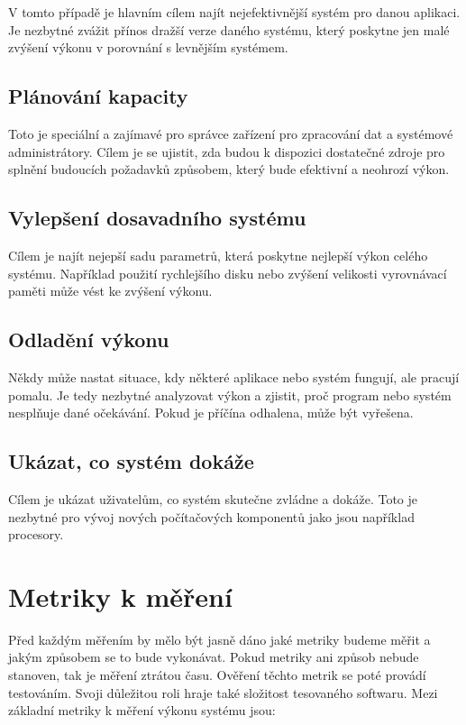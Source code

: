 V tomto případě je hlavním cílem najít nejefektivnější systém pro danou aplikaci. Je nezbytné zvážit přínos dražší verze daného systému, který poskytne jen malé zvýšení výkonu v porovnání s levnějším systémem.

\subsection*{Plánování kapacity}

Toto je speciální a zajímavé pro správce zařízení pro zpracování dat a systémové administrátory. Cílem je se ujistit, zda budou k dispozici dostatečné zdroje pro splnění budoucích požadavků způsobem, který bude efektivní a neohrozí výkon.

\subsection*{Vylepšení dosavadního systému}

Cílem je najít nejepší sadu parametrů, která poskytne nejlepší výkon celého systému. Například použití rychlejšího disku nebo zvýšení velikosti vyrovnávací paměti může vést ke zvýšení výkonu.

\subsection*{Odladění výkonu}

Někdy může nastat situace, kdy některé aplikace nebo systém fungují, ale pracují pomalu. Je tedy nezbytné analyzovat výkon a zjistit, proč program nebo systém nesplňuje dané očekávání. Pokud je příčína odhalena, může být vyřešena.

\subsection*{Ukázat, co systém dokáže}

Cílem je ukázat uživatelům, co systém skutečne zvládne a dokáže. Toto je nezbytné pro vývoj nových počítačových komponentů jako jsou například procesory.

\section{Metriky k měření}

Před každým měřením by mělo být jasně dáno jaké metriky budeme měřit a jakým způsobem se to bude vykonávat. Pokud metriky ani způsob nebude
stanoven, tak je měření ztrátou času. Ověření těchto metrik se poté provádí testováním. Svoji důležitou roli hraje také složitost tesovaného
softwaru. Mezi základní metriky k měření výkonu systému jsou:

